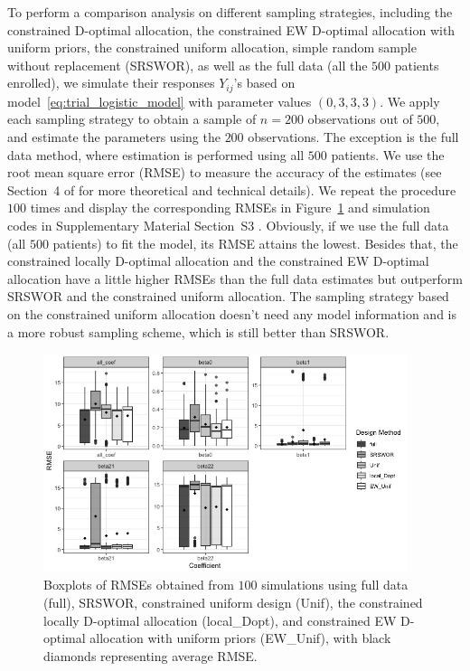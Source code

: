 To perform a comparison analysis on different sampling strategies, including the constrained D-optimal allocation, the constrained EW D-optimal allocation with uniform priors, the constrained uniform allocation, simple random sample without replacement (SRSWOR), as well as the full data (all the $500$ patients enrolled), we simulate their responses $Y_{ij}$'s based on model~\eqref{eq:trial_logistic_model} with parameter values $(0,3,3,3)$. We apply each sampling strategy to obtain a sample of $n=200$ observations out of $500$, and estimate the parameters using the $200$ observations. The exception is the full data method, where estimation is performed using all $500$ patients. We use the root mean square error (RMSE) to measure the accuracy of the estimates (see Section~4 of \cite{huang2023constrained} for more theoretical and technical details). We repeat the procedure $100$ times and display the corresponding RMSEs in Figure~\ref{fig:RMSE_GLM} and simulation codes in Supplementary Material Section~S3 \citep{ggplot2, dplyr}. Obviously, if we use the full data (all $500$ patients) to fit the model, its RMSE attains the lowest. Besides that, the constrained locally D-optimal allocation and the constrained EW D-optimal allocation have a little higher RMSEs than the full data estimates but outperform SRSWOR and the constrained uniform allocation. The sampling strategy based on the constrained uniform allocation doesn't need any model information and is a more robust sampling scheme, which is still better than SRSWOR.

\begin{figure}[htb!]
  \centering
  \includegraphics[width=0.95\textwidth]{figures/RMSE_paid.png}
  \caption{Boxplots of RMSEs obtained from $100$ simulations  using full data (full), SRSWOR, constrained uniform design (Unif), the constrained locally D-optimal allocation (local\_Dopt), and constrained EW D-optimal allocation with uniform priors (EW\_Unif), with black diamonds representing average RMSE.}
  \label{fig:RMSE_GLM}
\end{figure}

